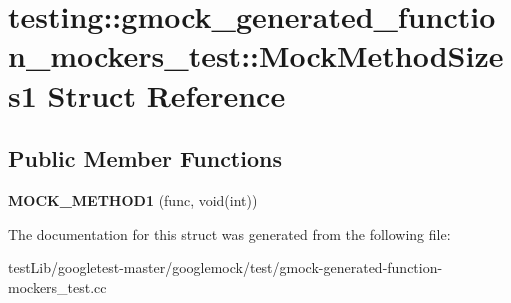 \hypertarget{structtesting_1_1gmock__generated__function__mockers__test_1_1MockMethodSizes1}{}\section{testing\+:\+:gmock\+\_\+generated\+\_\+function\+\_\+mockers\+\_\+test\+:\+:Mock\+Method\+Sizes1 Struct Reference}
\label{structtesting_1_1gmock__generated__function__mockers__test_1_1MockMethodSizes1}
\subsection*{Public Member Functions}
\begin{DoxyCompactItemize}
\item 
\mbox{\label{structtesting_1_1gmock__generated__function__mockers__test_1_1MockMethodSizes1_af4d80458626303520a848ad15e0e8121}} 
{\bfseries M\+O\+C\+K\+\_\+\+M\+E\+T\+H\+O\+D1} (func, void(int))
\end{DoxyCompactItemize}


The documentation for this struct was generated from the following file\+:\begin{DoxyCompactItemize}
\item 
test\+Lib/googletest-\/master/googlemock/test/gmock-\/generated-\/function-\/mockers\+\_\+test.\+cc\end{DoxyCompactItemize}
